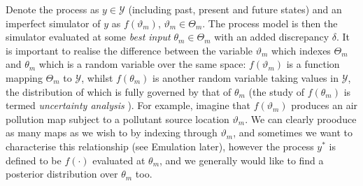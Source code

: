\documentclass[10pt,a4paper]{article}
\begin{document}
Denote the process as  $y \in \mathcal{Y}$ (including past, present and future states) and an imperfect simulator of $y$ as $f(\vartheta_m)$, $\vartheta_m \in \Theta_m$. The process model is then the simulator evaluated at some \emph{best input} $\theta_m \in \Theta_m$ with an added discrepancy $\delta$. It is important to realise the difference between the variable $\vartheta_m$ which indexes $\Theta_m$ and $\theta_m$ which is a random variable over the same space: $f(\vartheta_m)$ is a function mapping $\Theta_m$ to $\mathcal{Y}$, whilst $f(\theta_m)$ is another random variable taking values in $\mathcal{Y}$, the distribution of which is fully governed by that of $\theta_m$ (the study of $f(\theta_m)$ is termed \emph{uncertainty analysis} \cite{OHagan_1998}). For example, imagine that $f(\vartheta_m)$ produces an air pollution map subject to a pollutant source location $\vartheta_m$. We can clearly prooduce as many maps as we wish to by indexing through $\vartheta_m$, and sometimes we want to characterise this relationship (see Emulation later), however the process $y^*$ is defined to be $f(\cdot)$ evaluated at $\theta_m$, and we generally would like to find a posterior distribution over $\theta_m$ too. 
\end{document}
